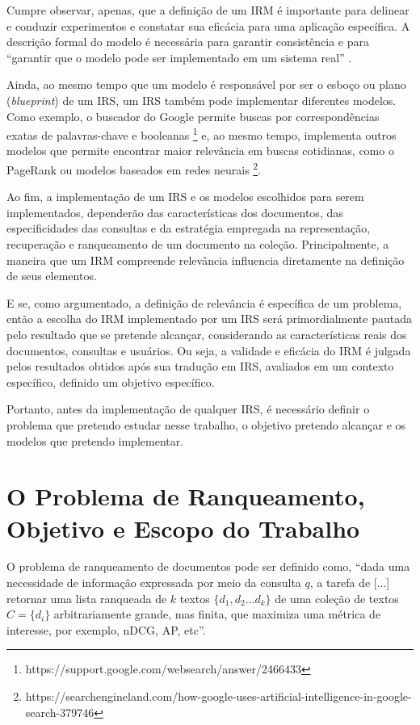 \documentclass[
	12pt,				%
	openright,			%
	oneside,			%
	a4paper,			%
	english,			%
	french,				%
	spanish,			%
	brazil				%
	]{abntex2}
\begin{document}
Cumpre observar, apenas, que a definição de um IRM é importante para delinear e conduzir experimentos e constatar sua eficácia para uma aplicação específica.
A descrição formal do modelo é necessária para garantir consistência e para ``garantir que o modelo pode ser implementado em um sistema real'' \cite{Hiemstra2009}.

Ainda, ao mesmo tempo que um modelo é responsável por ser o esboço ou plano (\textit{blueprint}) de um IRS, um IRS também pode implementar diferentes modelos.
Como exemplo, o buscador do Google permite buscas por correspondências exatas de palavras-chave e booleanas
\footnote{https://support.google.com/websearch/answer/2466433}
e, ao mesmo tempo, implementa outros modelos que permite encontrar maior relevância em buscas cotidianas, como o PageRank ou modelos baseados em redes neurais
\footnote{https://searchengineland.com/how-google-uses-artificial-intelligence-in-google-search-379746}.

Ao fim, a implementação de um IRS e os modelos escolhidos para serem implementados, dependerão das características dos documentos, das especificidades das consultas e da estratégia empregada na representação, recuperação e ranqueamento de um documento na coleção.
Principalmente, a maneira que um IRM compreende relevância influencia diretamente na definição de seus elementos.

E se, como argumentado, a definição de relevância é específica de um problema, então a escolha do IRM implementado por um IRS será primordialmente pautada pelo resultado que se pretende alcançar, considerando as características reais dos documentos, consultas e usuários.
Ou seja, a validade e eficácia do IRM é julgada pelos resultados obtidos após sua tradução em IRS, avaliados em um contexto específico, definido um objetivo específico.

Portanto, antes da implementação de qualquer IRS, é necessário definir o problema que pretendo estudar nesse trabalho, o objetivo pretendo alcançar e os modelos que pretendo implementar.



\section{O Problema de Ranqueamento, Objetivo e Escopo do Trabalho}\label{sec:o-problema-de-ranqueamento}

O problema de ranqueamento de documentos pode ser definido como, ``dada uma necessidade de informação expressada por meio da consulta $q$, a tarefa de [...] retornar uma lista
ranqueada de $k$ textos $\{d_1, d_2 ... d_k\}$ de uma coleção de textos $C = \{d_i\}$ arbitrariamente grande, mas finita, que maximiza uma métrica de interesse, por exemplo, nDCG, AP, etc''\cite{biblia}.
\end{document}
